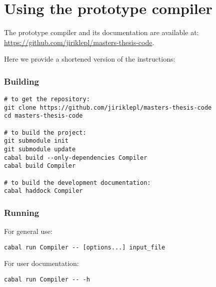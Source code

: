 \chapter{Using the prototype compiler}
\label{chap:proto}

The prototype compiler and its documentation are available at: \url{https://github.com/jiriklepl/masters-thesis-code}.

Here we provide a shortened version of the instructions:

\subsection*{Building}

\begin{lstlisting}[language=Sh]
# to get the repository:
git clone https://github.com/jiriklepl/masters-thesis-code
cd masters-thesis-code

# to build the project:
git submodule init
git submodule update
cabal build --only-dependencies Compiler
cabal build Compiler

# to build the development documentation:
cabal haddock Compiler
\end{lstlisting}

\subsection*{Running}

For general use:

\begin{lstlisting}[language=Sh]
cabal run Compiler -- [options...] input_file
\end{lstlisting}

\noindent For user documentation:

\begin{lstlisting}[language=Sh]
cabal run Compiler -- -h
\end{lstlisting}
